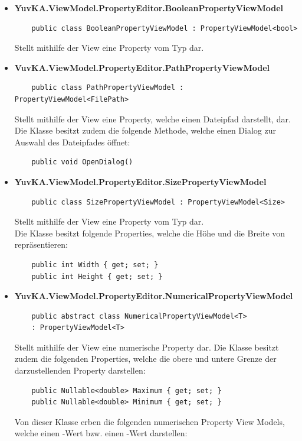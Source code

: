 \begin{itemize}

\item{\textbf{YuvKA.ViewModel.PropertyEditor.BooleanPropertyViewModel}}
	\begin{verbatim}
	public class BooleanPropertyViewModel : PropertyViewModel<bool>
	\end{verbatim}
	Stellt mithilfe der View eine Property vom Typ  dar.

\item{\textbf{VuvKA.ViewModel.PropertyEditor.PathPropertyViewModel}}
	\begin{verbatim}
	public class PathPropertyViewModel : PropertyViewModel<FilePath>
	\end{verbatim}
	Stellt mithilfe der View eine Property, welche einen Dateipfad darstellt, dar.\\
	Die Klasse besitzt zudem die folgende Methode, welche einen Dialog zur Auswahl des Dateipfades öffnet:
	\begin{verbatim}
	public void OpenDialog()
	\end{verbatim}

\item{\textbf{YuvKA.ViewModel.PropertyEditor.SizePropertyViewModel}}
	\begin{verbatim}
	public class SizePropertyViewModel : PropertyViewModel<Size>
	\end{verbatim}
	Stellt mithilfe der View eine Property vom Typ  dar.\\
	Die Klasse besitzt folgende Properties, welche die Höhe und die Breite von  repräsentieren:
	\begin{verbatim}
	public int Width { get; set; }
	public int Height { get; set; } 
	\end{verbatim}

\item{\textbf{YuvKA.ViewModel.PropertyEditor.NumericalPropertyViewModel}}
	\begin{verbatim}
	public abstract class NumericalPropertyViewModel<T> 
	: PropertyViewModel<T>
	\end{verbatim}
	Stellt mithilfe der View eine numerische Property dar. Die Klasse besitzt zudem die folgenden Properties, welche die obere und untere Grenze der darzustellenden Property darstellen:
	\begin{verbatim}
	public Nullable<double> Maximum { get; set; }
	public Nullable<double> Minimum { get; set; }
	\end{verbatim}
	Von dieser Klasse erben die folgenden numerischen Property View Models, welche einen -Wert bzw. einen -Wert darstellen:


\end{itemize}
